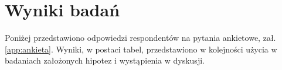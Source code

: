 \documentclass[a4paper,12pt,twoside,openright]{mwrep}
\begin{document}
\chapter*{Wyniki badań}

	Poniżej przedstawiono odpowiedzi respondentów na pytania ankietowe, zał. \ref{app:ankieta}. 
	Wyniki, w postaci tabel, przedstawiono w kolejności użycia w badaniach założonych hipotez i wystąpienia w dyskusji.
	
\vspace{\baselineskip} 






































\end{document}
